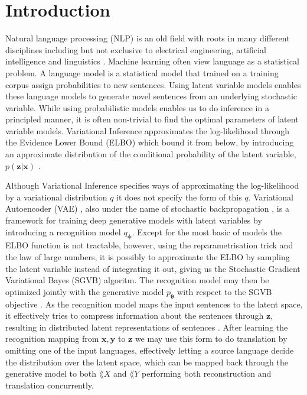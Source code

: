 \chapter{Introduction}
\label{IntroductionCh}



Natural language processing (NLP) is an old field with roots in many different
disciplines including but not exclusive to electrical engineering, artificial
intelligence and linguistics \cite[p.~10-15]{Jurafsky:2000:SLP:555733}. Machine
learning often view language as a statistical problem. A
language model is a statistical model that trained on a training corpus assign
probabilities to new sentences. Using latent variable models enables these
language models to generate novel sentences from an underlying stochastic
variable. While using probabilistic models enables us to do inference in a
principled manner, it is often non-trivial to find the optimal parameters of
latent variable models. Variational Inference approximates the log-likelihood
through the Evidence Lower Bound (ELBO) which bound it from below, by
introducing an approximate distribution of the conditional probability of the
latent variable, $p(\bm{z} | \bm{x})$ \cite{blei_variational_2017}.


Although Variational Inference specifies ways of approximating the
log-likelihood by a variational distribution $q$ it does not specify the form of
this $q$. Variational Autoencoder (VAE) \cite{kingma_auto-encoding_2013}, also
under the name of stochastic backpropagation \cite{2014arXiv1401.4082J}, is a
framework for training deep generative models with latent variables by
introducing a recognition model $q_{\bm{\phi}}$. Except for the most basic of
models the ELBO function is not tractable, however, using
the reparametrisation trick and the law of large numbers, it is possibly to
approximate the ELBO by sampling the latent variable instead of
integrating it out, giving us the Stochastic Gradient Variational Bayes (SGVB)
algoritm. The recognition model may then be optimized jointly with the
generative model $p_{\bm{\theta}}$ with respect to the SGVB objective \cite{kingma_auto-encoding_2013}. As the recognition model maps the
input sentences to the latent space, it effectively tries to compress
information about the sentences through $\bm{z}$, resulting in distributed
latent representations of sentences \cite{bowman_generating_2015}. After
learning the recognition mapping from $\bm{x}, \bm{y}$ to $\bm{z}$ we may use
this form to do translation by omitting one of the input languages, effectively
letting a source language decide the distribution over the latent space, which
can be mapped back through the generative model to both $\lang{X}$ and
$\lang{Y}$ performing both reconstruction and translation concurrently.




